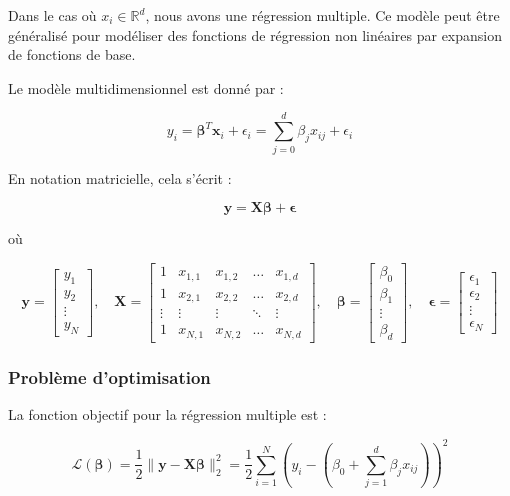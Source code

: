\documentclass[10pt,a4paper]{article}
\begin{document}
Dans le cas où $x_i \in \mathbb{R}^d$, nous avons une régression multiple. Ce modèle peut être généralisé pour modéliser des fonctions de régression non linéaires par expansion de fonctions de base.

Le modèle multidimensionnel est donné par :

$$
y_{i} = \boldsymbol{\beta}^{T} \mathbf{x}_{i} + \epsilon_{i} = \sum_{j=0}^{d} \beta_{j} x_{ij} + \epsilon_{i}
$$

En notation matricielle, cela s'écrit :

$$
\mathbf{y} = \mathbf{X} \boldsymbol{\beta} + \boldsymbol{\epsilon}
$$

où

$$
\mathbf{y} = \begin{bmatrix} y_{1} \\ y_{2} \\ \vdots \\ y_{N} \end{bmatrix}, \quad
\mathbf{X} = \begin{bmatrix}
1 & x_{1,1} & x_{1,2} & \ldots & x_{1,d} \\
1 & x_{2,1} & x_{2,2} & \ldots & x_{2,d} \\
\vdots & \vdots & \vdots & \ddots & \vdots \\
1 & x_{N,1} & x_{N,2} & \ldots & x_{N,d}
\end{bmatrix}, \quad
\boldsymbol{\beta} = \begin{bmatrix} \beta_{0} \\ \beta_{1} \\ \vdots \\ \beta_{d} \end{bmatrix}, \quad
\boldsymbol{\epsilon} = \begin{bmatrix} \epsilon_{1} \\ \epsilon_{2} \\ \vdots \\ \epsilon_{N} \end{bmatrix}
$$

\subsubsection*{Problème d'optimisation}

La fonction objectif pour la régression multiple est :

$$
\mathcal{L}(\boldsymbol{\beta}) = \frac{1}{2}\|\mathbf{y} - \mathbf{X} \boldsymbol{\beta}\|_{2}^{2} = \frac{1}{2} \sum_{i=1}^{N}\left(y_{i} - \left(\beta_{0} + \sum_{j=1}^{d} \beta_{j} x_{ij}\right)\right)^{2}
$$
\end{document}
